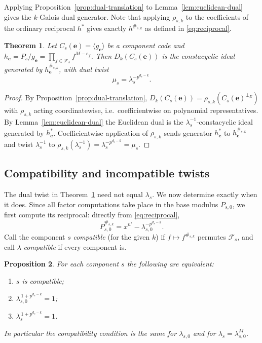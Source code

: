 \documentclass[preprint,12pt,a4paper]{elsarticle}
\newcommand{\Fs}{\mathcal F_s}
\newcommand{\Dk}{D_k}
\newcommand{\perpE}{\perp_{E}}
\newtheorem{theorem}{Theorem}
\newtheorem{proposition}[theorem]{Proposition}
\theoremstyle{definition}
\theoremstyle{remark}
\begin{document}
Applying Proposition~\ref{prop:dual-translation} to
Lemma~\ref{lem:euclidean-dual} gives the $k$-Galois dual generator.  Note that
applying $\rho_{s,k}$ to the coefficients of the ordinary reciprocal $h^\ast$
gives exactly $h^{\#_{s,k}}$ as defined in \eqref{eq:reciprocal}.

\begin{theorem}\label{thm:dual-generator}
Let $C_s(\mathbf{e})=\langle g_{\mathbf{e}}\rangle$ be a component code and
$h_{\mathbf{e}}=P_s/g_{\mathbf{e}}=\prod_{f\in\Fs}f^{M-e_f}$.  Then
$\Dk(C_s(\mathbf{e}))$ is the constacyclic ideal generated by
$h_{\mathbf{e}}^{\#_{s,k}}$, with dual twist
\[
\mu_s=\lambda_s^{-p^{d_s-k}}.
\]
\end{theorem}

\begin{proof}
By Proposition~\ref{prop:dual-translation},
$\Dk(C_s(\mathbf{e}))=\rho_{s,k}(C_s(\mathbf{e})^{\perpE})$ with $\rho_{s,k}$
acting coordinatewise, i.e.\ coefficientwise on polynomial representatives.
By Lemma~\ref{lem:euclidean-dual} the Euclidean dual is the
$\lambda_s^{-1}$-constacyclic ideal generated by $h_{\mathbf{e}}^\ast$.
Coefficientwise application of $\rho_{s,k}$ sends generator
$h_{\mathbf{e}}^\ast$ to $h_{\mathbf{e}}^{\#_{s,k}}$ and twist $\lambda_s^{-1}$
to $\rho_{s,k}(\lambda_s^{-1})=\lambda_s^{-p^{d_s-k}}=\mu_s$.
\end{proof}

\subsection{Compatibility and incompatible twists}\label{sec:compatibility}

The dual twist in Theorem~\ref{thm:dual-generator} need not equal $\lambda_s$.
We now determine exactly when it does.  Since all factor computations take place
in the base modulus $P_{s,0}$, we first compute its reciprocal: directly from
\eqref{eq:reciprocal},
\begin{equation}\label{eq:base-reciprocal}
P_{s,0}^{\#_{s,k}}
   =x^{n'}-\lambda_{s,0}^{-p^{d_s-k}}.
\end{equation}
Call the component $s$ \emph{compatible} (for the given $k$) if
$f\mapsto f^{\#_{s,k}}$ permutes $\Fs$, and call $\lambda$ \emph{compatible} if
every component is.

\begin{proposition}\label{prop:compatibility}
For each component $s$ the following are equivalent:
\begin{enumerate}
\item[\textup{(i)}] $s$ is compatible;
\item[\textup{(ii)}] $\lambda_{s,0}^{\,1+p^{d_s-k}}=1$;
\item[\textup{(iii)}] $\lambda_s^{\,1+p^{d_s-k}}=1$.
\end{enumerate}
In particular the compatibility condition is the same for $\lambda_{s,0}$ and
for $\lambda_s=\lambda_{s,0}^M$.
\end{proposition}
\end{document}
